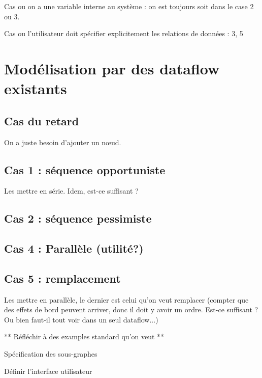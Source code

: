 \documentclass[french,a4paper]{article}
\begin{document}
Cas ou on a une variable interne au système : on est toujours soit dans le case 2 ou 3.

Cas ou l'utilisateur doit spécifier explicitement les relations de données : 3, 5

\section{Modélisation par des dataflow existants}
\subsection{Cas du retard}
On a juste besoin d'ajouter un nœud.

\subsection{Cas 1 : séquence opportuniste}
Les mettre en série. Idem, est-ce suffisant ? 

\subsection{Cas 2 : séquence pessimiste}

\subsection{Cas 4 : Parallèle (utilité?)}

\subsection{Cas 5 : remplacement}
Les mettre en parallèle, le dernier est celui qu'on veut remplacer (compter que des effets de bord peuvent arriver, donc il doit y avoir un ordre. Est-ce suffisant ? Ou bien faut-il tout voir dans un seul dataflow...)



** Réfléchir à des examples standard qu'on veut **


Spécification des sous-graphes

Définir l'interface utilisateur
\end{document}
